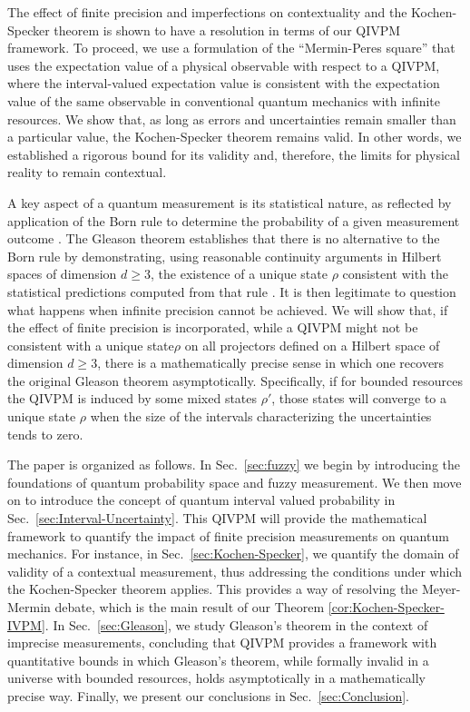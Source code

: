 \documentclass[english,reprint, aps, prl,superscriptaddress, showpacs,
showkeys, longbibliography, amsmath, amssymb]{revtex4-1}
\theoremstyle{plain}
\theoremstyle{definition}
\newcommand{\nb}{\nolinebreak[1] }
\begin{document}
The effect of finite precision and imperfections on contextuality and the
Kochen-Specker theorem is shown to have a resolution in terms of our QIVPM framework.  
To proceed, we use a formulation of the ``Mermin-Peres square'' \nb\cite{peres1995quantum,Mermin1990Simple} that uses the
expectation value of a physical observable with respect
to a QIVPM, where the interval-valued
expectation value is consistent with the expectation value of the
same observable in conventional quantum mechanics with infinite resources. We show that, 
as long as errors and uncertainties remain smaller than a particular value, the
Kochen-Specker theorem remains valid. In other words, we established a rigorous bound for 
its validity and, therefore, the limits for physical reality to remain contextual.

A key aspect of a quantum measurement is its statistical nature, as reflected
by application of the Born rule to determine the probability of a given measurement 
outcome \nb\citep{Born1983,peres1995quantum,544199}. The Gleason
theorem establishes that there is no alternative to the Born rule by 
demonstrating, using reasonable continuity arguments in Hilbert spaces
of dimension $d\ge3$, the existence of a unique state 
$\rho$ consistent with the statistical predictions computed from 
that rule \nb\citep{gleason1957,Redhead1987-REDINA,peres1995quantum}.
It is then legitimate to question what happens when infinite precision
cannot be achieved. We will show that, if the effect of finite precision is incorporated, 
while a QIVPM  might not be consistent
with a unique state\nb$\rho$ on all projectors defined on a Hilbert space of dimension $d\ge3$, 
there is a mathematically precise sense in which one recovers the original Gleason theorem asymptotically. 
Specifically, if for bounded resources the QIVPM is induced by some mixed states \nb$\rho'$, 
those states will converge to a unique state $\rho$ when the size of the intervals characterizing 
the uncertainties tends to zero. 

The paper is organized as follows.   In Sec.\ \ref{sec:fuzzy} we begin by introducing the foundations of quantum probability space and fuzzy measurement.  We then move on to introduce the concept of quantum interval valued probability in Sec.\ \ref{sec:Interval-Uncertainty}.  This QIVPM will provide the mathematical framework to quantify the impact of finite precision measurements on quantum mechanics.  For instance, in Sec.\ \ref{sec:Kochen-Specker},  we quantify the domain of validity of a  contextual measurement, thus addressing the conditions under which the Kochen-Specker theorem applies.  This provides a way of resolving the Meyer-Mermin debate, which is the main result of our Theorem \ref{cor:Kochen-Specker-IVPM}.  In Sec.\ \ref{sec:Gleason}, we study Gleason's theorem in the context of imprecise measurements, concluding that QIVPM provides a framework with quantitative bounds in which Gleason's theorem, while formally invalid in a universe with bounded resources, holds asymptotically in a mathematically precise way.  Finally, we present our conclusions in Sec.~\ref{sec:Conclusion}.
\end{document}
